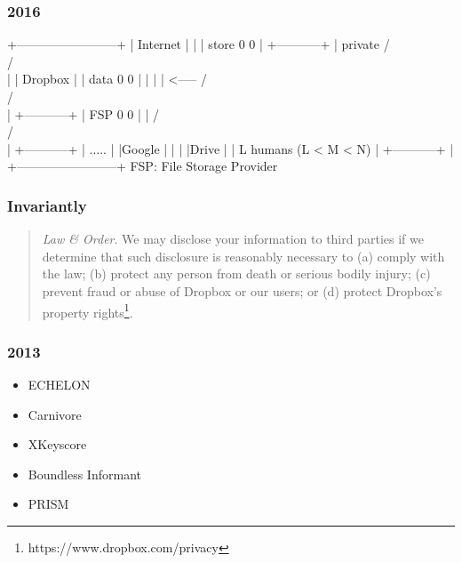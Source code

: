 \begin{frame}[fragile]
  \frametitle{2016}
  {\scriptsize
  \begin{semiverbatim}
   +------------------------+
   | Internet               |
   |                        | store    0   0
   |  +-----------+         | private / \\ / \\
   |  | Dropbox   |         |  data    0   0
   |  |           |         | <-----  / \\ / \\
   |  +-----------+         |   FSP    0   0
   |                        |         / \\ / \\
   |          +-----------+ |          .....
   |          |Google     | |
   |          |Drive      | |             L humans (L < M < N)
   |          +-----------+ |
   +------------------------+      FSP: File Storage Provider
  \end{semiverbatim}
  }
\end{frame}

\begin{frame}
  \frametitle{Invariantly}
  {\small
  \begin{quote}
    \emph{Law \& Order}. We may disclose your information to third
    parties if we determine that such disclosure is reasonably
    necessary to (a) comply with the law; (b) protect any person from
    death or serious bodily injury; (c) prevent fraud or abuse of
    Dropbox or our users; or (d) protect Dropbox's property
    rights\footnote{https://www.dropbox.com/privacy}.
  \end{quote}
  }
\end{frame}

\begin{frame}
  \frametitle{2013}

  \begin{itemize}
  \item ECHELON
  \item Carnivore
  \item XKeyscore
  \item Boundless Informant
  \item PRISM
  \end{itemize}
\end{frame}